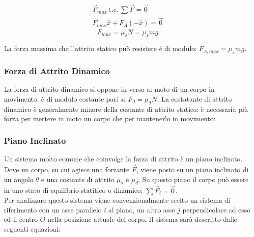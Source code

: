 \documentclass{article}
\numberwithin{equation}{subsection}
\begin{document}
\begin{gather*}
    \vec{F}_{max}\:\mbox{t.c.}\:\sum\vec{F}=\vec{0}\\
    F_{max}\hat{x}+F_A(-\hat{x})=\vec{0}
\end{gather*}
\begin{equation}
    F_{max}=\mu_sN=\mu_smg
\end{equation}

La forza massima che l'attrito statico può resistere è 
di modulo: $F_{A,max}=\mu_smg$.

\subsubsection{Forza di Attrito Dinamico}
La forza di attrito dinamico si oppone in verso al moto di un corpo 
in movimento, è di modulo costante pari a: $F_d=\mu_dN$. La 
costatante di attrito dinamico è generalmente minore della 
costante di attrito statico: è necessaria più forza per 
mettere in moto un corpo che per mantenerlo in movimento:

\begin{center}\end{center}

\subsubsection{Piano Inclinato}
Un sistema molto comune che coinvolge la forza di attrito 
è un piano inclinato. Dove un corpo, su cui agisce una forzante 
$\vec{F}$, viene posto su un piano inclinato 
di un angolo $\theta$ e una costante di attrito $\mu_s$ e 
$\mu_d$. Su questo piano il corpo può essere in uno stato di 
equilibrio statitico o dinamico: $\sum\vec{F}_i=\vec{0}$.\\
Per analizzare questo sistema viene convenzionalmente scelto 
un sistema di riferimento con un asse parallelo $i$ al piano, 
un altro asse $j$ perpendicolare ad esso ed il centro $O$ 
nella posizione attuale del corpo.
Il sistema sarà descritto dalle seguenti equazioni:
\end{document}
